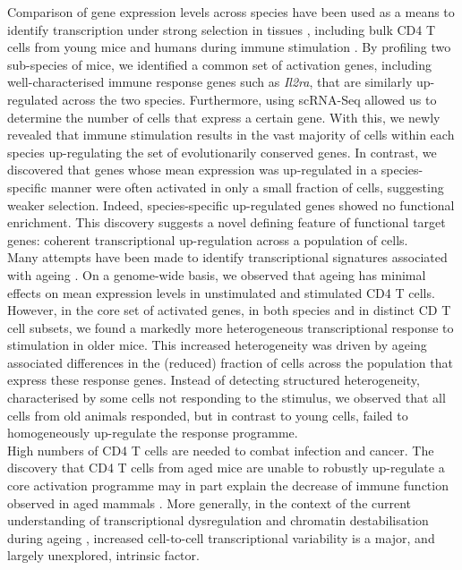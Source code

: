 Comparison of gene expression levels across species have been used as a means to identify transcription under strong selection in tissues \citep{Sudmant2015, Brawand2011, Romero2012, Barbosa-Morais2012, Perry2012}, including bulk CD4\plus{} T cells from young mice and humans during immune stimulation \citep{Shay2013}. By profiling two sub-species of mice, we identified a common set of activation genes, including well-characterised immune response genes such as \textit{Il2ra}, that are similarly up-regulated across the two species. Furthermore, using scRNA-Seq allowed us to determine the number of cells that express a certain gene. With this, we newly revealed that immune stimulation results in the vast majority of cells within each species up-regulating the set of evolutionarily conserved genes. In contrast, we discovered that genes whose mean expression was up-regulated in a species-specific manner were often activated in only a small fraction of cells, suggesting weaker selection. Indeed, species-specific up-regulated genes showed no functional enrichment. This discovery suggests a novel defining feature of functional target genes: coherent transcriptional up-regulation across a population of cells. \\

Many attempts have been made to identify transcriptional signatures associated with ageing \citep{DeMagalhaes2009, Magalhaes2009, Chen2013, Kowalczyk2015}. On a genome-wide basis, we observed that ageing has minimal effects on mean expression levels in unstimulated and stimulated CD4\plus{} T cells. However, in the core set of activated genes, in both species and in distinct CD\plus{} T cell subsets, we found a markedly more heterogeneous transcriptional response to stimulation in older mice. This increased heterogeneity was driven by ageing associated differences in the (reduced) fraction of cells across the population that express these response genes. Instead of detecting structured heterogeneity, characterised by some cells not responding to the stimulus, we observed that all cells from old animals responded, but in contrast to young cells, failed to homogeneously up-regulate the response programme. \\

High numbers of CD4\plus{} T cells are needed to combat infection and cancer. The discovery that CD4\plus{} T cells from aged mice are unable to robustly up-regulate a core activation programme may in part explain the decrease of immune function observed in aged mammals \citep{Goronzy2013, Nikolich-Zugich2018}. More generally, in the context of the current understanding of transcriptional dysregulation and chromatin destabilisation during ageing \citep{Booth2016}, increased cell-to-cell transcriptional variability is a major, and largely unexplored, intrinsic factor.\\

